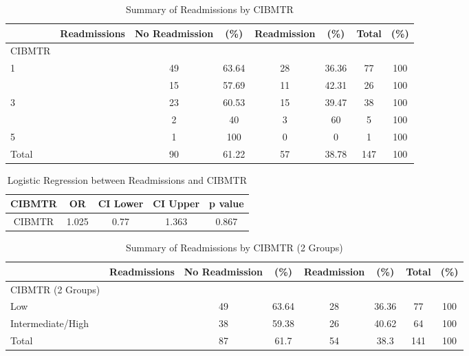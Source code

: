 \documentclass[12pt,]{article}
\begin{document}
\begin{table}[!h]

\caption{\label{tab:unnamed-chunk-42}Summary of Readmissions by CIBMTR}
\centering
\begin{tabular}{>{\centering\arraybackslash}p{5cm}ccccccc}
\toprule
  & Readmissions & No Readmission & (\%) & Readmission & (\%) & Total & (\%)\\
\midrule
CIBMTR &  &  &  &  &  &  & \\
\rowcolor[HTML]{E3E5E7}  1 &  & 49 & 63.64 & 28 & 36.36 & 77 & 100\\
2 &  & 15 & 57.69 & 11 & 42.31 & 26 & 100\\
\rowcolor[HTML]{E3E5E7}  3 &  & 23 & 60.53 & 15 & 39.47 & 38 & 100\\
4 &  & 2 & 40 & 3 & 60 & 5 & 100\\
\addlinespace
\rowcolor[HTML]{E3E5E7}  5 &  & 1 & 100 & 0 & 0 & 1 & 100\\
Total &  & 90 & 61.22 & 57 & 38.78 & 147 & 100\\
\bottomrule
\end{tabular}
\end{table}

\begin{table}[!h]

\caption{\label{tab:unnamed-chunk-42}Logistic Regression between Readmissions and CIBMTR}
\centering
\begin{tabular}{ccccc}
\toprule
CIBMTR & OR & CI Lower & CI Upper & p value\\
\midrule
\rowcolor{white}  CIBMTR & 1.025 & 0.77 & 1.363 & 0.867\\
\bottomrule
\end{tabular}
\end{table}

\pagebreak

\begin{table}[!h]

\caption{\label{tab:unnamed-chunk-43}Summary of Readmissions by CIBMTR (2 Groups)}
\centering
\begin{tabular}{>{\centering\arraybackslash}p{5cm}ccccccc}
\toprule
  & Readmissions & No Readmission & (\%) & Readmission & (\%) & Total & (\%)\\
\midrule
CIBMTR (2 Groups) &  &  &  &  &  &  & \\
\rowcolor[HTML]{E3E5E7}  Low &  & 49 & 63.64 & 28 & 36.36 & 77 & 100\\
Intermediate/High &  & 38 & 59.38 & 26 & 40.62 & 64 & 100\\
\rowcolor[HTML]{E3E5E7}  Total &  & 87 & 61.7 & 54 & 38.3 & 141 & 100\\
\bottomrule
\end{tabular}
\end{table}
\end{document}
